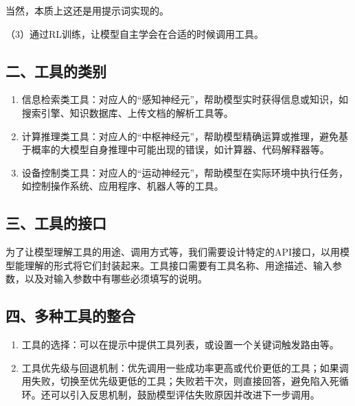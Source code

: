 当然，本质上这还是用提示词实现的。

（3）通过RL训练，让模型自主学会在合适的时候调用工具。

\hypertarget{ux4e8cux5de5ux5177ux7684ux7c7bux522b}{%
\subsection{二、工具的类别}\label{ux4e8cux5de5ux5177ux7684ux7c7bux522b}}

\begin{enumerate}
\def\labelenumi{\arabic{enumi}.}
\item
  信息检索类工具：对应人的``感知神经元''，帮助模型实时获得信息或知识，如搜索引擎、知识数据库、上传文档的解析工具等。
\item
  计算推理类工具：对应人的``中枢神经元''，帮助模型精确运算或推理，避免基于概率的大模型自身推理中可能出现的错误，如计算器、代码解释器等。
\item
  设备控制类工具：对应人的``运动神经元''，帮助模型在实际环境中执行任务，如控制操作系统、应用程序、机器人等的工具。
\end{enumerate}

\hypertarget{ux4e09ux5de5ux5177ux7684ux63a5ux53e3}{%
\subsection{三、工具的接口}\label{ux4e09ux5de5ux5177ux7684ux63a5ux53e3}}

为了让模型理解工具的用途、调用方式等，我们需要设计特定的API接口，以用模型能理解的形式将它们封装起来。工具接口需要有工具名称、用途描述、输入参数，以及对输入参数中有哪些必须填写的说明。

\hypertarget{ux56dbux591aux79cdux5de5ux5177ux7684ux6574ux5408}{%
\subsection{四、多种工具的整合}\label{ux56dbux591aux79cdux5de5ux5177ux7684ux6574ux5408}}

\begin{enumerate}
\def\labelenumi{\arabic{enumi}.}
\item
  工具的选择：可以在提示中提供工具列表，或设置一个关键词触发路由等。
\item
  工具优先级与回退机制：优先调用一些成功率更高或代价更低的工具；如果调用失败，切换至优先级更低的工具；失败若干次，则直接回答，避免陷入死循环。还可以引入反思机制，鼓励模型评估失败原因并改进下一步调用。
\end{enumerate}


